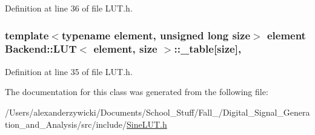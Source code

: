 Definition at line 36 of file L\+U\+T.\+h.

\hypertarget{classBackend_1_1LUT_ae70f3f0c9aaa9e0b85517d8e2c61d9a5}{
\subsubsection[{\+\_\+table}]{\setlength{\rightskip}{0pt plus 5cm}template$<$typename element, unsigned long size$>$ element {\bf Backend\+::\+L\+U\+T}$<$ element, size $>$\+::\+\_\+table\mbox{[}size\mbox{]}\hspace{0.3cm}{\ttfamily [protected]}, {\ttfamily [inherited]}}}\label{classBackend_1_1LUT_ae70f3f0c9aaa9e0b85517d8e2c61d9a5}


Definition at line 35 of file L\+U\+T.\+h.



The documentation for this class was generated from the following file\+:\begin{DoxyCompactItemize}
\item 
/\+Users/alexanderzywicki/\+Documents/\+School\+\_\+\+Stuff/\+Fall\+\_/\+Digital\+\_\+\+Signal\+\_\+\+Generation\+\_\+and\+\_\+\+Analysis/src/include/\hyperlink{SineLUT_8h}{Sine\+L\+U\+T.\+h}\end{DoxyCompactItemize}
